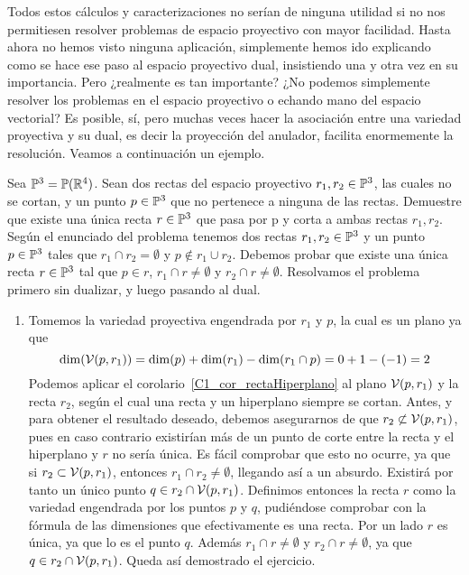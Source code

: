 Todos estos cálculos y caracterizaciones no serían de ninguna utilidad si no nos permitiesen resolver problemas de espacio proyectivo con mayor facilidad. Hasta ahora no hemos visto ninguna aplicación, simplemente hemos ido explicando como se hace ese paso al espacio proyectivo dual, insistiendo una y otra vez en su importancia. Pero ¿realmente es tan importante? ¿No podemos simplemente resolver los problemas en el espacio proyectivo o echando mano del espacio vectorial? Es posible, sí, pero muchas veces hacer la asociación entre una variedad proyectiva y su dual, es decir la proyección del anulador, facilita enormemente la resolución. Veamos a continuación un ejemplo.
\begin{exa}
	Sea $\mathbb{P}^3=\mathbb{P}(\mathbb{R}^4)$. Sean dos rectas del espacio proyectivo $r_1,r_2\in\mathbb{P}^3$, las cuales no se cortan, y un punto $p\in\mathbb{P}^3$ que no pertenece a ninguna de las rectas. Demuestre que existe una única recta $r\in\mathbb{P}^3$ que pasa por p y corta a ambas rectas $r_1, r_2$.\\
	
	Según el enunciado del problema tenemos dos rectas $r_1,r_2\in\mathbb{P}^3$ y un punto $p\in\mathbb{P}^3$ tales que $r_1\cap r_2=\emptyset$ y $p\not\in r_1\cup r_2$. Debemos probar que existe una única recta $r\in\mathbb{P}^3$ tal que $p\in r$, $r_1\cap r\not=\emptyset$ y $r_2\cap r\not=\emptyset$. Resolvamos el problema primero sin dualizar, y luego pasando al dual.
	\begin{enumerate}
		\item Tomemos la variedad proyectiva engendrada por $r_1$ y $p$, la cual es un plano ya que
		\begin{equation*}
			\dim(\mathcal{V}(p,r_1))=\dim(p)+\dim(r_1)-\dim(r_1\cap p)=0+1-(-1)=2
		\end{equation*}
		Podemos aplicar el corolario~\ref{C1_cor_rectaHiperplano} al plano $\mathcal{V}(p,r_1)$ y la recta $r_2$, según el cual una recta y un hiperplano siempre se cortan. Antes, y para obtener el resultado deseado, debemos asegurarnos de que $r_2\not\subset\mathcal{V}(p,r_1)$, pues en caso contrario existirían más de un punto de corte entre la recta y el hiperplano y $r$ no sería única. Es fácil comprobar que esto no ocurre, ya que si $r_2\subset\mathcal{V}(p,r_1)$, entonces $r_1\cap r_2\not=\emptyset$, llegando así a un absurdo. Existirá por tanto un único punto $q\in r_2\cap\mathcal{V}(p,r_1)$. Definimos entonces la recta $r$ como la variedad engendrada por los puntos $p$ y $q$, pudiéndose comprobar con la fórmula de las dimensiones que efectivamente es una recta. Por un lado $r$ es única, ya que lo es el punto $q$. Además $r_1\cap r\not=\emptyset$ y $r_2\cap r\not=\emptyset$, ya que $q\in r_2\cap\mathcal{V}(p,r_1)$. Queda así demostrado el ejercicio.
		

\end{enumerate}
\end{exa}
